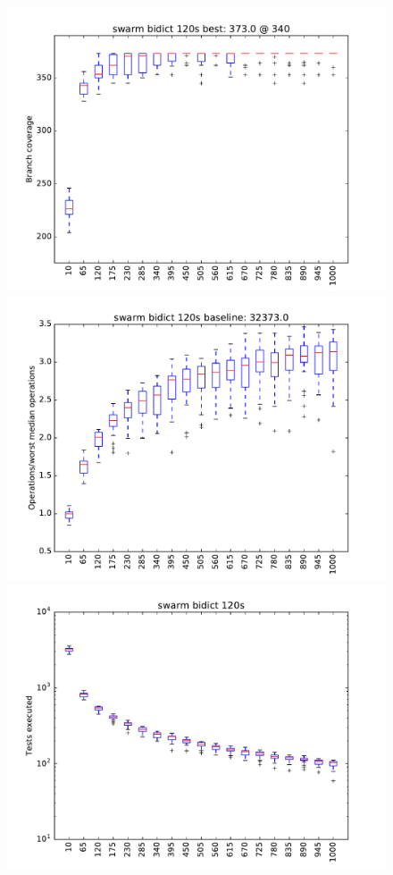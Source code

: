 \begin{figure}
\includegraphics[width=\columnwidth]{graphs/bidictswarm120}
\includegraphics[width=\columnwidth]{graphs/opsbidictswarm120}
\includegraphics[width=\columnwidth]{graphs/execbidictswarm120}
\end{figure}


